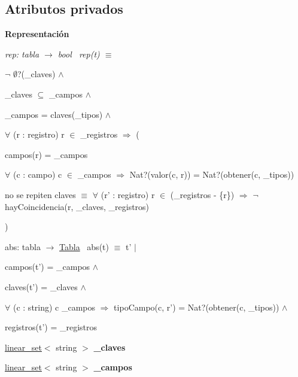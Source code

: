 \subsection*{Atributos privados}
\begin{Indent}{\bf Representación}\par
{\em rep\+: tabla $\to$ bool~\newline
rep(t) $\equiv$
\begin{DoxyItemize}
\item $\lnot$ $\emptyset$?(\+\_\+claves) $\land$
\item \+\_\+claves $\subseteq$ \+\_\+campos $\land$
\item \+\_\+campos = claves(\+\_\+tipos) $\land$
\item $\forall$ (r \+: registro) r $\in$ \+\_\+registros $\Rightarrow$ (
\begin{DoxyItemize}
\item campos(r) = \+\_\+campos
\item $\forall$ (c \+: campo) c $\in$ \+\_\+campos $\Rightarrow$ Nat?(valor(c, r)) = Nat?(obtener(c, \+\_\+tipos))
\item no se repiten claves $\equiv$ $\forall$ (r' \+: registro) r $\in$ (\+\_\+registros -\/ \{r\}) $\Rightarrow$ $\lnot$ hay\+Coincidencia(r, \+\_\+claves, \+\_\+registros)
\end{DoxyItemize}
\item )
\end{DoxyItemize}

abs\+: tabla $\to$ \hyperlink{classTabla}{Tabla}~\newline
abs(t) $\equiv$ t' $|$
\begin{DoxyItemize}
\item campos(t') = \+\_\+campos $\land$
\item claves(t') = \+\_\+claves $\land$
\item $\forall$ (c \+: string) c  \+\_\+campos $\Rightarrow$ tipo\+Campo(c, r') = Nat?(obtener(c, \+\_\+tipos)) $\land$
\item registros(t') = \+\_\+registros 
\end{DoxyItemize}}\begin{DoxyCompactItemize}
\item 
\hypertarget{classTabla_a3fc11c070caf35a44a23724a6a5bae92}{\hyperlink{classlinear__set}{linear\+\_\+set}$<$ string $>$ {\bfseries \+\_\+claves}}\label{classTabla_a3fc11c070caf35a44a23724a6a5bae92}

\item 
\hypertarget{classTabla_ac527baaf100aea820dd4d1687b0f2378}{\hyperlink{classlinear__set}{linear\+\_\+set}$<$ string $>$ {\bfseries \+\_\+campos}}\label{classTabla_ac527baaf100aea820dd4d1687b0f2378}


\end{DoxyCompactItemize}
\end{Indent}
